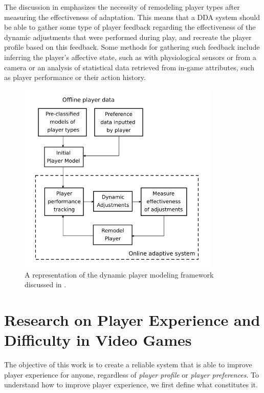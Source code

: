 The discussion in \cite{ARTICLE_DynamicPlayerModelling} emphasizes the necessity of remodeling player types after measuring the effectiveness of adaptation. This means that a DDA system should be able to gather some type of player feedback regarding the effectiveness of the dynamic adjustments that were performed during play, and recreate the player profile based on this feedback. Some methods for gathering such feedback include inferring the player's affective state, such as with physiological sensors or from a camera or an analysis of statistical data retrieved from in-game attributes, such as player performance or their action history.

\begin{figure}[!h]
    \caption{A representation of the dynamic player modeling framework discussed in \cite{ARTICLE_DynamicPlayerModelling}.}
    \begin{center}
        \includegraphics[width=26em]{figures/fig-dynamic-player-model.png}
    \end{center}
    \label{fig:dynamic-player-model}
\end{figure}

\section{Research on Player Experience and Difficulty in Video Games}

The objective of this work is to create a reliable system that is able to improve player experience for anyone, regardless of \emph{player profile} or \emph{player preferences}. To understand how to improve player experience, we first define what constitutes it.

